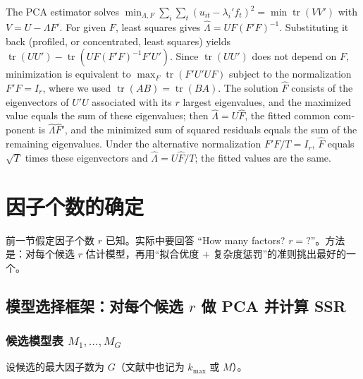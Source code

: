 \begin{english}
The PCA estimator solves $\min_{\Lambda,F}\sum_i\sum_t(u_{it}-\lambda_i'f_t)^2=\min\operatorname{tr}(VV')$ with $V=U-\Lambda F'$. For given $F$, least squares gives $\hat\Lambda=UF(F'F)^{-1}$. Substituting it back (profiled, or concentrated, least squares) yields $\operatorname{tr}(UU')-\operatorname{tr}(UF(F'F)^{-1}F'U')$. Since $\operatorname{tr}(UU')$ does not depend on $F$, minimization is equivalent to $\max_F\operatorname{tr}(F'U'UF)$ subject to the normalization $F'F=I_r$, where we used $\operatorname{tr}(AB)=\operatorname{tr}(BA)$. The solution $\hat F$ consists of the eigenvectors of $U'U$ associated with its $r$ largest eigenvalues, and the maximized value equals the sum of these eigenvalues; then $\hat\Lambda=U\hat F$, the fitted common component is $\hat\Lambda\hat F'$, and the minimized sum of squared residuals equals the sum of the remaining eigenvalues. Under the alternative normalization $F'F/T=I_r$, $\hat F$ equals $\sqrt T$ times these eigenvectors and $\hat\Lambda=U\hat F/T$; the fitted values are the same.
\end{english}

\section{因子个数的确定}\label{sec:U13b-nfac}

前一节假定因子个数 $r$ 已知。实际中要回答 “How many factors? $r=?$”。方法是：对每个候选 $r$ 估计模型，再用“拟合优度 $+$ 复杂度惩罚”的准则挑出最好的一个。

\subsection{模型选择框架：对每个候选 \texorpdfstring{$r$}{r} 做 PCA 并计算 SSR}

\subsubsection{候选模型表 \texorpdfstring{$M_1,\dots,M_G$}{M\_1,...,M\_G}}

设候选的最大因子数为 $G$（文献中也记为 $k_{\max}$ 或 $M$）。

